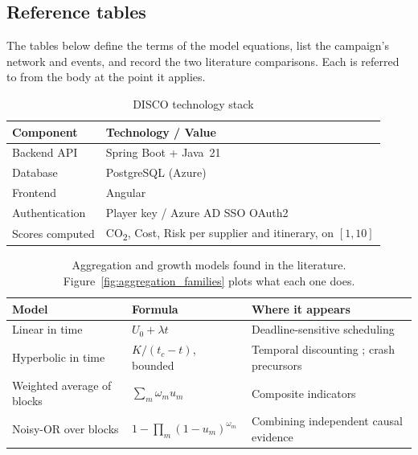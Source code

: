 \subsection{Reference tables}

The tables below define the terms of the model equations, list the campaign's network
and events, and record the two literature comparisons. Each is referred to from the
body at the point it applies.

\begin{table}[htbp]
\centering
\caption{DISCO technology stack}
\label{tab:disco_stack}
\begin{tabularx}{\linewidth}{lX}
\toprule
\textbf{Component} & \textbf{Technology / Value} \\
\midrule
Backend API    & Spring Boot + Java~21 \\
Database       & PostgreSQL (Azure) \\
Frontend       & Angular \\
Authentication & Player key / Azure AD SSO OAuth2 \\
Scores computed & CO\textsubscript{2}, Cost, Risk per supplier and itinerary, on $[1,10]$ \\
\bottomrule
\end{tabularx}
\end{table}

\begin{table}[htbp]
\centering
\caption[Aggregation and growth models found in the literature]{Aggregation and growth
models found in the literature. Figure~\ref{fig:aggregation_families} plots what each
one does.}
\label{tab:urgency_models}
\small
\begin{tabularx}{\linewidth}{>{\raggedright\arraybackslash}p{3.4cm} >{\raggedright\arraybackslash}p{3.6cm} >{\raggedright\arraybackslash}X}
\toprule
\textbf{Model} & \textbf{Formula} & \textbf{Where it appears} \\
\midrule
Linear in time & $U_0 + \lambda t$ & Deadline-sensitive scheduling
\autocite{cheng1996due} \\[3pt]
Hyperbolic in time & $K / (t_c - t)$, bounded & Temporal discounting
\autocite{steel2006integrating}; crash precursors \autocite{johansen2001finite} \\[3pt]
Weighted average of blocks & $\sum_m \omega_m u_m$ & Composite indicators
\autocite{greco2018} \\[3pt]
Noisy-OR over blocks & $1-\prod_m(1-u_m)^{\omega_m}$ & Combining independent causal evidence
\autocite{pearl1988probabilistic} \\
\bottomrule
\end{tabularx}
\end{table}

